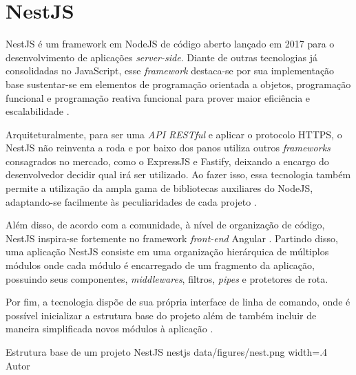 \section{NestJS}
\label{sec:nestjs}
NestJS é um framework em NodeJS de código aberto lançado em 2017 para o desenvolvimento de aplicações \textit{server-side}. Diante de outras tecnologias já consolidadas no JavaScript, esse \textit{framework} destaca-se por sua implementação base sustentar-se em elementos de programação orientada a objetos, programação funcional e programação reativa funcional para prover maior eficiência e escalabilidade \cite{Mysliwiec2023b}.

Arquiteturalmente, para ser uma \textit{API RESTful} e aplicar o protocolo HTTPS, o NestJS não reinventa a roda e por baixo dos panos utiliza outros \textit{frameworks} consagrados no mercado, como o ExpressJS e Fastify, deixando a encargo do desenvolvedor decidir qual irá ser utilizado. Ao fazer isso, essa tecnologia também permite a utilização da ampla gama de bibliotecas auxiliares do NodeJS, adaptando-se facilmente às peculiaridades de cada projeto \cite{Mysliwiec2023}.

Além disso, de acordo com a comunidade, à nível de organização de código, NestJS inspira-se fortemente no framework \textit{front-end} Angular \cite{Passos2018}. Partindo disso, uma aplicação NestJS consiste em uma organização hierárquica de múltiplos módulos onde cada módulo é encarregado de um fragmento da aplicação, possuindo seus componentes, \textit{middlewares}, filtros, \textit{pipes} e protetores de rota.

Por fim, a tecnologia dispõe de sua própria interface de linha de comando, onde é possível inicializar a estrutura base do projeto além de também incluir de maneira simplificada novos módulos à aplicação \cite{Mysliwiec2023a}.

\image
    {Estrutura base de um projeto NestJS}
    {nestjs}
    {data/figures/nest.png}
    {width=.4\textwidth}
    {Autor}